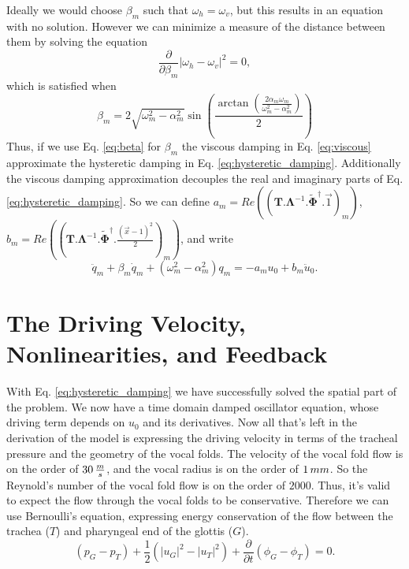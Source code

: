 \documentclass[superscriptaddress, onecolumn, prl]{revtex4}
\begin{document}
Ideally we would choose $\beta_m$ such that $\omega_h=\omega_v$, but this results in an equation with no solution. However we can minimize a measure of the distance between them by solving the equation
\begin{equation}
\label{eq:frequency_distance}
\frac{\partial}{\partial \beta_m} |\omega_h - \omega_v|^2 = 0,
\end{equation}
which is satisfied when
\begin{equation}
\label{eq:beta}
\beta_m = 2 \sqrt{\omega_m^2 - \alpha_m^2} \sin \left( \frac{\arctan \left( \frac{2 \alpha_m \omega_m}{\omega_m^2 - \alpha_m^2} \right)}{2} \right) 
\end{equation}
Thus, if we use Eq. \ref{eq:beta} for $\beta_m$ the viscous damping in Eq. \ref{eq:viscous} approximate the hysteretic damping in Eq. \ref{eq:hysteretic_damping}. Additionally the viscous damping approximation decouples the real and imaginary parts of Eq. \ref{eq:hysteretic_damping}. So we can define $a_m = Re((\boldsymbol{T}.\boldsymbol{\Lambda}^{-1}.\widetilde{\boldsymbol{\Phi}}^\dagger.\vec{1})_m)$, $b_m=Re((\boldsymbol{T}.\boldsymbol{\Lambda}^{-1}.\widetilde{\boldsymbol{\Phi}}^\dagger.\frac{(\vec{x}-1)^2}{2})_m)$, and write
\begin{equation}
\label{eq:viscous2}
\ddot{q}_m + \beta_m \dot{q}_m +(\omega_m^2 - \alpha_m^2) q_m = -a_m u_0 +b_m \ddot{u}_0.
\end{equation}  
\section{The Driving Velocity, Nonlinearities, and Feedback}
With Eq. \ref{eq:hysteretic_damping} we have successfully solved the spatial part of the problem. We now have a time domain damped oscillator equation, whose driving term depends on $u_0$ and its derivatives. Now all that's left in the derivation of the model is expressing the driving velocity in terms of the tracheal pressure and the geometry of the vocal folds. The velocity of the vocal fold flow is on the order of $30 \thinspace \frac{m}{s}$, and the vocal radius is on the order of $1 \thinspace mm$. So the Reynold's number of the vocal fold flow is on the order of $2000$. Thus, it's valid to expect the flow through the vocal folds to be conservative. Therefore we can use Bernoulli's equation, expressing energy conservation of the flow between the trachea ($T$) and pharyngeal end of the glottis ($G$).  
\begin{equation}
\label{eq:energy1}
(p_{G} - p_{T}) + \frac{1}{2}(|u_{G}|^2 - |u_{T}|^2) + \frac{\partial}{\partial t} (\phi_{G} - \phi_{T}) = 0.
\end{equation}  
\end{document}
